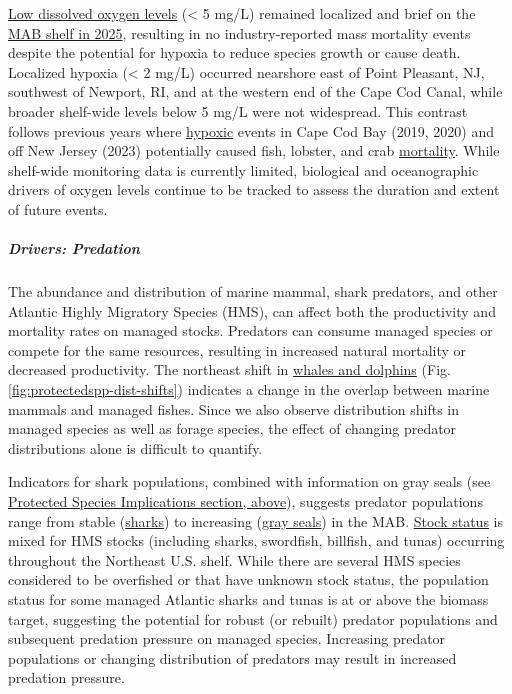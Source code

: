 \documentclass[
  10pt,
]{article}
\begin{document}
\href{https://noaa-edab.github.io/catalog/dissolved_oxygen.html}{Low dissolved oxygen levels} (\textless{} 5 mg/L) remained localized and brief on the \href{https://noaa-edab.github.io/catalog/observation_synthesis_2023.html}{MAB shelf in 2025}, resulting in no industry-reported mass mortality events despite the potential for hypoxia to reduce species growth or cause death. Localized hypoxia (\textless{} 2 mg/L) occurred nearshore east of Point Pleasant, NJ, southwest of Newport, RI, and at the western end of the Cape Cod Canal, while broader shelf-wide levels below 5 mg/L were not widespread. This contrast follows previous years where \href{https://noaa-edab.github.io/catalog/observation_synthesis_2023.html}{hypoxic} events in Cape Cod Bay (2019, 2020) and off New Jersey (2023) potentially caused fish, lobster, and crab \href{https://sebsnjaesnews.rutgers.edu/2023/12/rutgers-scientists-observe-unusual-ocean-conditions-possibly-linked-to-mortality-in-marine-life-off-new-jersey/}{mortality}. While shelf-wide monitoring data is currently limited, biological and oceanographic drivers of oxygen levels continue to be tracked to assess the duration and extent of future events.

\subparagraph{Drivers: Predation}\label{drivers-predation}

The abundance and distribution of marine mammal, shark predators, and other Atlantic Highly Migratory Species (HMS), can affect both the productivity and mortality rates on managed stocks. Predators can consume managed species or compete for the same resources, resulting in increased natural mortality or decreased productivity. The northeast shift in \href{https://noaa-edab.github.io/catalog/cetacean_dist.html}{whales and dolphins} (Fig. \ref{fig:protectedspp-dist-shifts}) indicates a change in the overlap between marine mammals and managed fishes. Since we also observe distribution shifts in managed species as well as forage species, the effect of changing predator distributions alone is difficult to quantify.

Indicators for shark populations, combined with information on gray seals (see \hyperref[protected-species]{Protected Species Implications section, above}), suggests predator populations range from stable (\href{https://noaa-edab.github.io/catalog/hms_cpue.html}{sharks}) to increasing (\href{https://noaa-edab.github.io/catalog/seal_pups.html}{gray seals}) in the MAB. \href{https://noaa-edab.github.io/catalog/hms_stock_status.html}{Stock status} is mixed for HMS stocks (including sharks, swordfish, billfish, and tunas) occurring throughout the Northeast U.S. shelf. While there are several HMS species considered to be overfished or that have unknown stock status, the population status for some managed Atlantic sharks and tunas is at or above the biomass target, suggesting the potential for robust (or rebuilt) predator populations and subsequent predation pressure on managed species. Increasing predator populations or changing distribution of predators may result in increased predation pressure.
\end{document}
